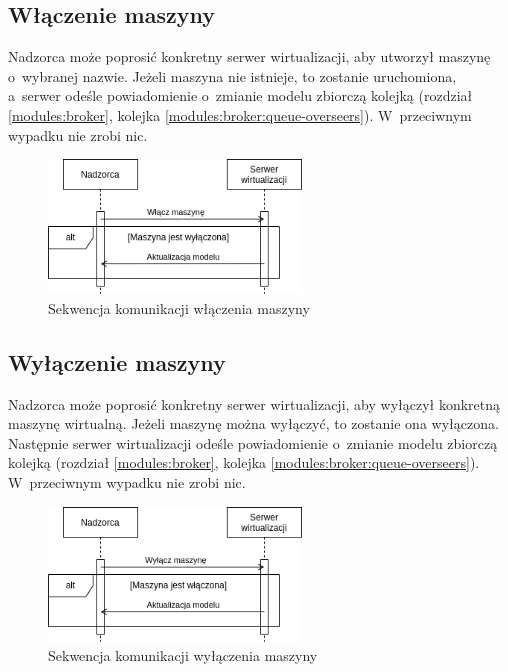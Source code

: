 \documentclass[../opis-rozwiazania.tex]{subfiles}
\begin{document}
\subsection{Włączenie maszyny}

Nadzorca może poprosić konkretny serwer wirtualizacji, aby utworzył maszynę o~wybranej nazwie.
Jeżeli maszyna nie istnieje, to zostanie uruchomiona, a~serwer odeśle powiadomienie o~zmianie modelu zbiorczą kolejką (rozdział \ref{modules:broker}, kolejka \ref{modules:broker:queue-overseers}).
W~przeciwnym wypadku nie zrobi nic.

\begin{figure}[ht!]
  \centering
  \includegraphics[width=0.6\textwidth]{../diagrams/sequence_diagrams/wlaczenie_maszyny.png}
  \caption{Sekwencja komunikacji włączenia maszyny}
  \label{figure:diagrams:sequence_diagrams:wlaczenie_maszyny}
\end{figure}

\subsection{Wyłączenie maszyny}

Nadzorca może poprosić konkretny serwer wirtualizacji, aby wyłączył konkretną maszynę wirtualną.
Jeżeli maszynę można wyłączyć, to zostanie ona wyłączona.
Następnie serwer wirtualizacji odeśle powiadomienie o~zmianie modelu zbiorczą kolejką (rozdział \ref{modules:broker}, kolejka \ref{modules:broker:queue-overseers}).
W~przeciwnym wypadku nie zrobi nic.

\begin{figure}[ht!]
  \centering
  \includegraphics[width=0.6\textwidth]{../diagrams/sequence_diagrams/wylaczenie_maszyny.png}
  \caption{Sekwencja komunikacji wyłączenia maszyny}
  \label{figure:diagrams:sequence_diagrams:wylaczenie_maszyny}
\end{figure}
\end{document}
